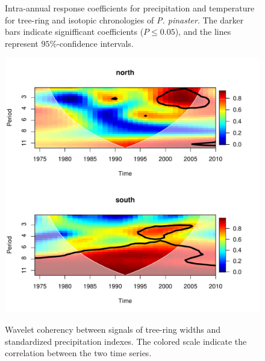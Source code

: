 \documentclass[review,authoryear]{elsarticle}
\begin{document}
\begin{landscape}
\begin{figure}
\begin{minipage}[b]{0.8\textwidth}
\end{minipage}
\label{fig:FunRes}
\caption{Intra-annual response coefficients for precipitation and
  temperature for tree-ring and isotopic chronologies of
  \textit{P. pinaster}. The darker bars indicate signifficant
  coefficients ($P\le0.05$), and the lines represent $95\%$-confidence
  intervals.}
  \end{figure}
\end{landscape}

\clearpage
\begin{figure}
\centering
\includegraphics[scale=0.7,trim=20mm 0mm 20mm 0mm]{coherence1}
\label{fig:coherence1}
\caption{Wavelet coherency between signals of tree-ring widths and
  standardized precipitation indexes. The colored scale indicate the
  correlation between the two time series.}
\end{figure}


\end{document}
